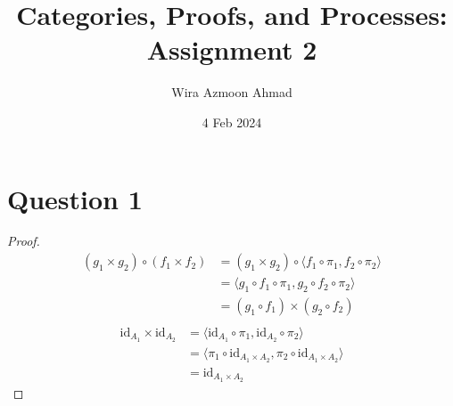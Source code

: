 \documentclass[11pt]{article} %
\title{Categories, Proofs, and Processes: \\Assignment 2}
\author{Wira Azmoon Ahmad}
\date{4 Feb 2024}
\theoremstyle{definition}
\begin{document}
%
\maketitle




\section*{Question 1}
\addtocounter{section}{1}

\begin{proof}
\begin{equation}
\begin{aligned}
  (g_1 \times g_2)\circ (f_1 \times f_2) 
  &= (g_1 \times g_2)\circ \langle f_1 \circ \pi_1, f_2 \circ \pi_2 \rangle\\
  &= \langle g_1 \circ f_1 \circ \pi_1, g_2 \circ f_2 \circ \pi_2 \rangle\\
  &= (g_1 \circ f_1) \times (g_2 \circ f_2)\\
\end{aligned}
\end{equation}
\begin{equation}
\begin{aligned}
  \text{id}_{A_1}\times \text{id}_{A_2} 
  &= \langle \text{id}_{A_1} \circ \pi_1, \text{id}_{A_2} \circ \pi_2 \rangle\\
  &= \langle \pi_1 \circ \text{id}_{A_1 \times A_2}, \pi_2 \circ \text{id}_{A_1 \times A_2} \rangle\\
  &= \text{id}_{A_1 \times A_2}
\end{aligned}
\end{equation}
\end{proof}
\end{document}
